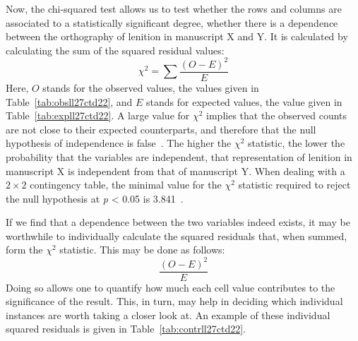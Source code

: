 Now, the chi-squared test allows us to test whether the rows and columns are associated to a statistically significant degree, \ie whether there is a dependence between the orthography of lenition in manuscript X and Y. It is calculated by calculating the sum of the squared residual values:
\[\chi^2=\sum{\frac{(O-E)^2}{E}}\]
Here, \(O\) stands for the observed values, \eg the values given in Table~\ref{tab:obsll27ctd22}, and \(E\) stands for expected values, \eg the value given in Table~\ref{tab:expll27ctd22}. A large value for \(\chi^2\) implies that the observed counts are not close to their expected counterparts, and therefore that the null hypothesis of independence is false~\autocite[756--757]{MS_Statistics09}. The higher the \(\chi^2\) statistic, the lower the probability that the variables are independent, \eg that representation of lenition in manuscript X is independent from that of manuscript Y. When dealing with a \(2 \times 2\) contingency table, the minimal value for the \(\chi^2\) statistic required to reject the null hypothesis at \textit{p} < 0.05 is 3.841~\autocite[798]{MS_Statistics09}.

If we find that a dependence between the two variables indeed exists, it may be worthwhile to individually calculate the squared residuals that, when summed, form the \(\chi^2\) statistic. This may be done as follows:
\[\frac{(O-E)^2}{E}\]
Doing so allows one to quantify how much each cell value contributes to the significance of the result. This, in turn, may help in deciding which individual instances are worth taking a closer look at. An example of these individual squared residuals is given in Table~\ref{tab:contrll27ctd22}.


